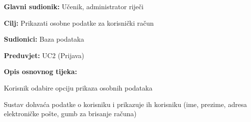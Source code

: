 				\noindent {}
				\begin{packed_item}
					
					\item \textbf{Glavni sudionik: }Učenik, administrator riječi
					\item  \textbf{Cilj:} Prikazati osobne podatke za korisnički račun
					\item  \textbf{Sudionici:} Baza podataka
					\item  \textbf{Preduvjet:} UC2 (Prijava)
					\item  \textbf{Opis osnovnog tijeka:}
					
					\item[] \begin{packed_enum}
						
						\item Korisnik odabire opciju prikaza osobnih podataka
						\item Sustav dohvaća podatke o korisniku i prikazuje ih korisniku (ime, prezime, adresa elektroničke pošte, gumb za brisanje računa) 
						
					\end{packed_enum}
					
				\end{packed_item}
				
